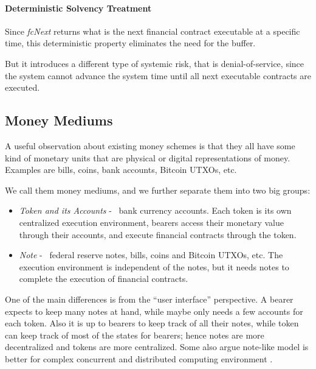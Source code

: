\paragraph{Deterministic Solvency Treatment}

Since \textit{fcNext} returns what is the next financial contract executable at a specific time,
this deterministic property eliminates the need for the buffer.

But it introduces a different type of systemic risk, that is denial-of-service, since the system
cannot advance the system time until all next executable contracts are executed.

\subsection{Money Mediums}

\begin{displayquote}
A useful observation about existing money schemes is that they all have some kind of monetary units
that are physical or digital representations of money. Examples are bills, coins, bank accounts,
Bitcoin UTXOs, etc. 
\end{displayquote}

We call them money mediums, and we further separate them into two big groups:

\begin{itemize}
    \item \textit{Token and its Accounts} - \eg\ bank currency accounts. Each token is its own
centralized execution environment, bearers access their monetary value through their accounts, and
execute financial contracts through the token.

    \item \textit{Note} - \eg\ federal reserve notes, bills, coins and Bitcoin UTXOs, etc. The
execution environment is independent of the notes, but it needs notes to complete the execution of
financial contracts.
\end{itemize}

One of the main differences is from the ``user interface'' perspective. A bearer expects to keep
many notes at hand, while maybe only needs a few accounts for each token. Also it is up to bearers
to keep track of all their notes, while token can keep track of most of the states for bearers;
hence notes are more decentralized and tokens are more centralized. Some also argue note-like model
is better for complex concurrent and distributed computing environment
.

